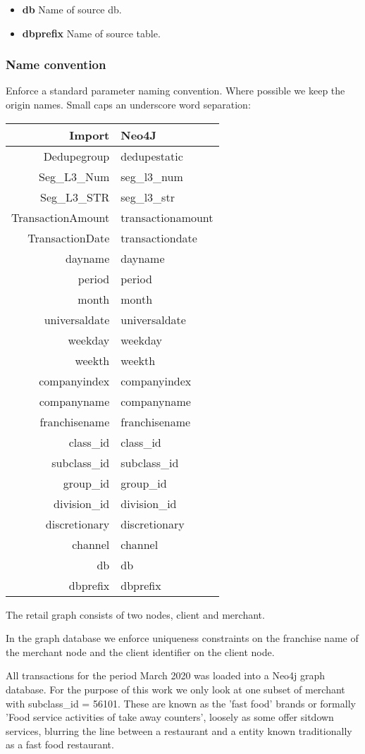 \begin{itemize}
  \item \textbf{db} Name of source db.
  \item \textbf{dbprefix} Name of source table.
\end{itemize}


\subsubsection{Name convention}
Enforce a standard parameter naming convention.  Where possible we keep the origin names.  Small caps an underscore word separation:

\begin{center}
 \begin{tabular}{||r l||} 
 \hline
 Import & Neo4J  \\ [0.5ex] 
 \hline\hline
 Dedupegroup & dedupestatic \\ 
 Seg\_L3\_Num & seg\_l3\_num \\
 Seg\_L3\_STR & seg\_l3\_str \\
 TransactionAmount & transactionamount \\
 TransactionDate & transactiondate \\
 dayname & dayname \\ 
 period & period \\ 
 month & month \\ 
 
 universaldate & universaldate \\ 
 weekday & weekday \\
 weekth & weekth \\
 companyindex & companyindex \\
 companyname & companyname \\ 
 franchisename & franchisename \\  
 class\_id & class\_id \\ 
 subclass\_id & subclass\_id \\ 
 group\_id & group\_id \\
 division\_id & division\_id \\
 discretionary & discretionary \\ 
 channel & channel \\ 
 db & db \\ 
 dbprefix & dbprefix \\
 \hline
\end{tabular}
\end{center}


The retail graph consists of two nodes, client and merchant. 

In the graph database we enforce uniqueness constraints on the franchise name of the merchant node and the client identifier on the client node. 

All transactions for the period March 2020 was loaded into a Neo4j graph database. For the purpose of this work we only look at one subset of merchant with subclass\_id = 56101.  These are known as the 'fast food' brands or formally 'Food service activities of take away counters', loosely as some offer sitdown services, blurring the line between a restaurant and a entity known traditionally as a fast food restaurant.